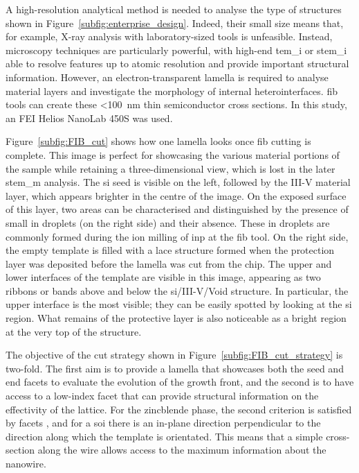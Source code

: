 A high-resolution analytical method is needed to analyse the type of structures shown in Figure~\ref{subfig:enterprise_design}. Indeed, their small size means that, for example, X-ray analysis with laboratory-sized tools is unfeasible. Instead, microscopy techniques are particularly powerful, with high-end \acf{tem_i} or \acf{stem_i} able to resolve features up to atomic resolution and provide important structural information. However, an electron-transparent lamella is required to analyse material layers and investigate the morphology of internal heterointerfaces. \Acf{fib} tools can create these <\qty{100}{\nano\metre} thin semiconductor cross sections. In this study, an FEI Helios NanoLab 450S was used.
\par
Figure~\ref{subfig:FIB_cut} shows how one lamella looks once \acs{fib} cutting is complete. This image is perfect for showcasing the various material portions of the sample while retaining a three-dimensional view, which is lost in the later \acs{stem_m} analysis. The \acl{si} seed is visible on the left, followed by the III-V material layer, which appears brighter in the centre of the image. On the exposed surface of this layer, two areas can be characterised and distinguished by the presence of small \acl{in} droplets (on the right side) and their absence. These \acl{in} droplets are commonly formed during the ion milling of \acl{inp} at the \acs{fib} tool. On the right side, the empty template is filled with a  lace structure formed when the protection layer was deposited before the lamella was cut from the chip. The upper and lower interfaces of the template are visible in this image, appearing as two ribbons or bands above and below the \acs{si}/III-V/Void structure. In particular, the upper interface is the most visible; they can be easily spotted by looking at the \acs{si} region. What remains of the  protective layer is also noticeable as a bright region at the very top of the structure.
\par
The objective of the cut strategy shown in Figure~\ref{subfig:FIB_cut_strategy} is two-fold. The first aim is to provide a lamella that showcases both the seed and end facets to evaluate the evolution of the growth front, and the second is to have access to a low-index facet that can provide structural information on the effectivity of the lattice. For the zincblende phase, the second criterion is satisfied by  facets \cite{Dasilva2017}, and for a  \acs{soi} there is an in-plane \hkl[-1 1 0] direction perpendicular to the \hkl[1 1 0] direction along which the template is orientated. This means that a simple cross-section along the wire allows access to the maximum information about the nanowire.

